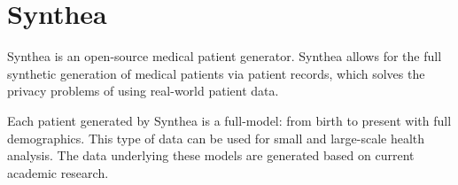 \section{Synthea}

Synthea \cite{hid-sp18-www-526-synthea} is an open-source
medical patient generator. Synthea allows for the full synthetic
generation of medical patients via patient records, which solves
the privacy problems of using real-world patient data.

Each patient generated by Synthea is a full-model: from birth
to present with full demographics. This type of data can be used
for small and large-scale health analysis. The data underlying
these models are generated based on current academic research.
